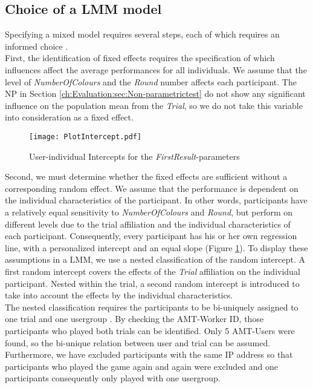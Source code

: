 \subsection{Choice of a \ac{LMM} model}
Specifying a mixed model requires several steps, each of which requires an informed choice \citep{Seltman2012}. \\
First, the identification of  fixed effects requires the specification of which influences affect the average performances for all individuals.  We assume that the level of \textit{NumberOfColours} and the \textit{Round} number affects each participant.
The \acl{NP} in Section \ref{ch:Evaluation:sec:Non-parametrictest} do not show any significant influence on the population mean from the \textit{Trial}, so we do not take this variable into consideration as a fixed effect.\\
\begin{figure}[htbp] %
\begin{center} 
\texttt{[image: PlotIntercept.pdf]}
  \caption{User-individual Intercepts for the \textit{FirstResult}-parameters}
    \label{fig:Intercepts} 
\end{center}
\end{figure}
Second, we must determine whether the fixed effects are sufficient without a corresponding random effect. We assume that the performance is dependent on the individual characteristics of the participant. In other words, participants have a relatively equal sensitivity to \textit{NumberOfColours} and \textit{Round}, but perform on different levels due to the trial affiliation and the individual characteristics of each participant. Consequently, every participant has his or her own regression line, with a personalized intercept and an equal slope (Figure \ref{fig:Intercepts}).
To display these assumptions in a \ac{LMM}, we use a nested classification of the random intercept. A first random intercept covers the effects of the \textit{Trial} affiliation on the individual participant. Nested within the trial, a second random intercept is introduced to take into account the effects by the individual characteristics.\\
The nested classification requires the participants to be bi-uniquely assigned to one trial and one usergroup \citep{Galecki2013}. By checking the \ac{AMT}-Worker ID, those participants who played both trials can be identified. Only 5 \ac{AMT}-Users were found, so the  bi-unique relation between user and trial can be assumed. Furthermore, we have excluded participants with the same IP address so that participants who played the game again and again were excluded and one participants consequently only played with one usergroup.\\
